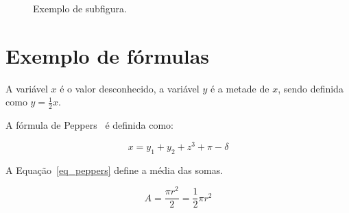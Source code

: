 \documentclass[11pt,twocolumn]{article}
\begin{document}
\begin{figure}[h]
  \centering
  
  
  
  \caption{Exemplo de subfigura.}
  \label{fig_exemplo2}
\end{figure}


\section{Exemplo de fórmulas}

A variável $x$ é o valor desconhecido, a variável $y$ é a metade de $x$, sendo definida como $y=\frac{1}{2}x$.

A fórmula de Peppers~\cite{berg2006logica} é definida como:

$$
  x = y_1 + y_2 + z^3 + \pi - \delta
$$

A Equação~\ref{eq_peppers} define a média das somas.

\begin{equation}\label{eq_peppers}
A = \frac{\pi r^2}{2} = \frac{1}{2} \pi r^2   
\end{equation} 














  
\end{document}
